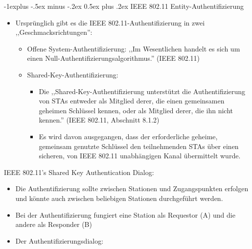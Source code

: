 \documentclass[a4paper]{article}
\makeatletter
\renewcommand{\subsection}{\@startsection{subsection}{2}{0mm}%
 {-1explus -.5ex minus -.2ex}%
 {0.5ex plus .2ex}%
 {\normalfont\normalsize\bfseries}}
\makeatother
\begin{document}
\begin{multicols}{3}
    \subsection{IEEE 802.11
        Entity-Authentifizierung}

    \begin{itemize}
        \item
              Ursprünglich gibt es die IEEE 802.11-Authentifizierung in zwei
              ,,Geschmacksrichtungen'':

              \begin{itemize}
                  \item
                        Offene System-Authentifizierung: ,,Im Wesentlichen handelt es sich
                        um einen Null-Authentifizierungsalgorithmus.'' (IEEE 802.11)
                  \item
                        Shared-Key-Authentifizierung:

                        \begin{itemize}
                            \item
                                  Die ,,Shared-Key-Authentifizierung unterstützt die
                                  Authentifizierung von STAs entweder als Mitglied derer, die einen
                                  gemeinsamen geheimen Schlüssel kennen, oder als Mitglied derer,
                                  die ihn nicht kennen.'' (IEEE 802.11, Abschnitt 8.1.2)
                            \item
                                  Es wird davon ausgegangen, dass der erforderliche geheime,
                                  gemeinsam genutzte Schlüssel den teilnehmenden STAs über einen
                                  sicheren, von IEEE 802.11 unabhängigen Kanal übermittelt wurde.
                        \end{itemize}
              \end{itemize}
    \end{itemize}

    IEEE 802.11's Shared Key Authentication Dialog:

    \begin{itemize}
        \item
              Die Authentifizierung sollte zwischen Stationen und Zugangspunkten
              erfolgen und könnte auch zwischen beliebigen Stationen durchgeführt
              werden.
        \item
              Bei der Authentifizierung fungiert eine Station als Requestor (A) und
              die andere als Responder (B)
        \item
              Der Authentifizierungsdialog:


\end{itemize}
\end{multicols}
\end{document}
